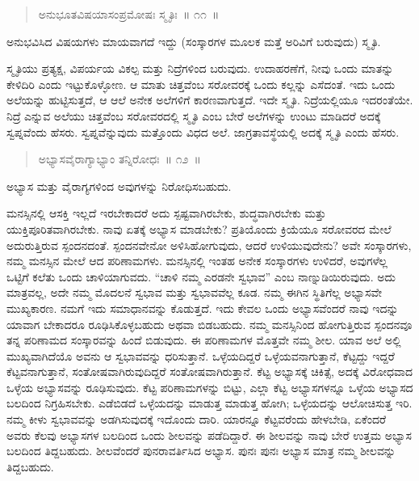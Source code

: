 \vspace{-0.2cm}

\begin{verse}
ಅನುಭೂತವಿಷಯಾಸಂಪ್ರಮೋಷಃ ಸ್ಮೃತಿಃ~॥ ೧೧~॥
\end{verse}

\vspace{-0.1cm}

ಅನುಭವಿಸಿದ ವಿಷಯಗಳು ಮಾಯವಾಗದೆ ಇದ್ದು (ಸಂಸ್ಕಾರಗಳ ಮೂಲಕ ಮತ್ತೆ ಅರಿವಿಗೆ ಬರುವುದು) ಸ್ಮೃತಿ. 

ಸ್ಮೃತಿಯು ಪ್ರತ್ಯಕ್ಷ, ವಿಪರ್ಯಯ ವಿಕಲ್ಪ ಮತ್ತು ನಿದ್ರೆಗಳಿಂದ ಬರುವುದು. ಉದಾಹರಣೆಗೆ, ನೀವು ಒಂದು ಮಾತನ್ನು ಕೇಳಿದಿರಿ ಎಂದು ಇಟ್ಟುಕೊಳ್ಳೋಣ. ಆ ಮಾತು ಚಿತ್ತವೆಂಬ ಸರೋವರಕ್ಕೆ ಒಂದು ಕಲ್ಲನ್ನು ಎಸೆದಂತೆ. ಇದು ಒಂದು ಅಲೆಯನ್ನು ಹುಟ್ಟಿಸುತ್ತದೆ, ಆ ಆಲೆ ಅನೇಕ ಅಲೆಗಳಿಗೆ ಕಾರಣವಾಗುತ್ತದೆ. ಇದೇ ಸ್ಮೃತಿ. ನಿದ್ರೆಯಲ್ಲಿಯೂ ಇದರಂತೆಯೇ. ನಿದ್ರೆ ಎನ್ನುವ ಅಲೆಯು ಚಿತ್ತವೆಂಬ ಸರೋವರದಲ್ಲಿ ಸ್ಮೃತಿ ಎಂಬ ಬೇರೆ ಅಲೆಗಳನ್ನು ಉಂಟು ಮಾಡಿದರೆ ಅದಕ್ಕೆ ಸ್ವಪ್ನವೆಂದು ಹೆಸರು. ಸ್ವಪ್ನವೆನ್ನುವುದು ಮತ್ತೊಂದು ವಿಧದ ಅಲೆ. ಜಾಗ್ರತಾವಸ್ಥೆಯಲ್ಲಿ ಅದಕ್ಕೆ ಸ್ಮೃತಿ ಎಂದು ಹೆಸರು. 

\vspace{-0.2cm}

\begin{verse}
ಅಭ್ಯಾಸವೈರಾಗ್ಯಾಭ್ಯಾಂ ತನ್ನಿರೋಧಃ~॥ ೧೨~॥
\end{verse}

\vspace{-0.1cm}

ಅಭ್ಯಾಸ ಮತ್ತು ವೈರಾಗ್ಯಗಳಿಂದ ಅವುಗಳನ್ನು ನಿರೋಧಿಸಬಹುದು. 

ಮನಸ್ಸಿನಲ್ಲಿ ಆಸಕ್ತಿ ಇಲ್ಲದೆ ಇರಬೇಕಾದರೆ ಅದು ಸ್ಪಷ್ಟವಾಗಿರಬೇಕು, ಶುದ್ಧವಾಗಿರಬೇಕು ಮತ್ತು ಯುಕ್ತಿಪೂರಿತವಾಗಿರಬೇಕು. ನಾವು ಏತಕ್ಕೆ ಅಭ್ಯಾಸ ಮಾಡಬೇಕು? ಪ್ರತಿಯೊಂದು ಕ್ರಿಯೆಯೂ ಸರೋವರದ ಮೇಲೆ ಅದುರುತ್ತಿರುವ ಸ್ಪಂದನದಂತೆ. ಸ್ಪಂದನವೇನೋ ಅಳಿಸಿಹೋಗುವುದು, ಆದರೆ ಉಳಿಯುವುದೇನು? ಅವೇ ಸಂಸ್ಕಾರಗಳು, ನಮ್ಮ ಮನಸ್ಸಿನ ಮೇಲೆ ಆದ ಪರಿಣಾಮಗಳು. ಮನಸ್ಸಿನಲ್ಲಿ ಇಂತಹ ಅನೇಕ ಸಂಸ್ಕಾರಗಳು ಉಳಿದರೆ, ಅವುಗಳೆಲ್ಲ ಒಟ್ಟಿಗೆ ಕಲೆತು ಒಂದು ಚಾಳಿಯಾಗುವದು. “ಚಾಳಿ ನಮ್ಮ ಎರಡನೇ ಸ್ವಭಾವ” ಎಂಬ ನಾಣ್ನುಡಿಯಿರುವುದು. ಅದು ಮಾತ್ರವಲ್ಲ, ಅದೇ ನಮ್ಮ ಮೊದಲನೆ ಸ್ವಭಾವ ಮತ್ತು ಸ್ವಭಾವವೆಲ್ಲ ಕೂಡ. ನಮ್ಮ ಈಗಿನ ಸ್ಥಿತಿಗೆಲ್ಲ ಅಭ್ಯಾಸವೇ ಮುಖ್ಯಕಾರಣ. ನಮಗೆ ಇದು ಸಮಾಧಾನವನ್ನು ಕೊಡುತ್ತದೆ. ಇದು ಕೇವಲ ಒಂದು ಅಭ್ಯಾಸವೆಂದರೆ ನಾವು ಇದನ್ನು ಯಾವಾಗ ಬೇಕಾದರೂ ರೂಢಿಸಿಕೊಳ್ಳಬಹುದು ಅಥವಾ ಬಿಡಬಹುದು. ನಮ್ಮ ಮನಸ್ಸಿನಿಂದ ಹೋಗುತ್ತಿರುವ ಸ್ಪಂದನವೂ ತನ್ನ ಪರಿಣಾಮದ ಸಂಸ್ಕಾರವನ್ನು ಹಿಂದೆ ಬಿಡುವುದು. ಈ ಪರಿಣಾಮಗಳ ಮೊತ್ತವೇ ನಮ್ಮ ಶೀಲ. ಯಾವ ಅಲೆ ಅಲ್ಲಿ ಮುಖ್ಯವಾಗಿದೆಯೊ ಅವನು ಆ ಸ್ವಭಾವವನ್ನು ಧರಿಸುತ್ತಾನೆ. ಒಳ್ಳೆಯದಿದ್ದರೆ ಒಳ್ಳೆಯವನಾಗುತ್ತಾನೆ, ಕೆಟ್ಟದ್ದು ಇದ್ದರೆ ಕೆಟ್ಟವನಾಗುತ್ತಾನೆ, ಸಂತೋಷವಾಗಿರುವುದಿದ್ದರೆ ಸಂತೋಷವಾಗಿರುತ್ತಾನೆ. ಕೆಟ್ಟ ಅಭ್ಯಾಸಕ್ಕೆ ಚಿಕಿತ್ಸೆ, ಅದಕ್ಕೆ ವಿರೋಧವಾದ ಒಳ್ಳೆಯ ಅಭ್ಯಾಸವನ್ನು ರೂಢಿಸುವುದು. ಕೆಟ್ಟ ಪರಿಣಾಮಗಳನ್ನು ಬಿಟ್ಟು, ಎಲ್ಲಾ ಕೆಟ್ಟ ಅಭ್ಯಾಸಗಳನ್ನೂ ಒಳ್ಳೆಯ ಅಭ್ಯಾಸದ ಬಲದಿಂದ ನಿಗ್ರಹಿಸಬೇಕು. ಎಡೆಬಿಡದೆ ಒಳ್ಳೆಯದನ್ನು ಮಾಡುತ್ತ ಮಾಡುತ್ತ ಹೋಗಿ; ಒಳ್ಳೆಯದನ್ನು ಆಲೋಚಿಸುತ್ತ ಇರಿ. ನಮ್ಮ ಕೀಳು ಸ್ವಭಾವವನ್ನು ಅಡಗಿಸುವುದಕ್ಕೆ ಇದೊಂದು ದಾರಿ. ಯಾರನ್ನೂ ಕೆಟ್ಟವರೆಂದು ಹೇಳಬೇಡಿ, ಏಕೆಂದರೆ ಅವರು ಕೆಲವು ಅಭ್ಯಾಸಗಳ ಬಲದಿಂದ ಒಂದು ಶೀಲವನ್ನು ಪಡೆದಿದ್ದಾರೆ. ಈ ಶೀಲವನ್ನು ನಾವು ಬೇರೆ ಉತ್ತಮ ಅಭ್ಯಾಸ ಬಲದಿಂದ ತಿದ್ದಬಹುದು. ಶೀಲವೆಂದರೆ ಪುನರಾವರ್ತಿಸಿದ ಅಭ್ಯಾಸ. ಪುನಃ ಪುನಃ ಅಭ್ಯಾಸ ಮಾತ್ರ ನಮ್ಮ ಶೀಲವನ್ನು ತಿದ್ದಬಹುದು. 

